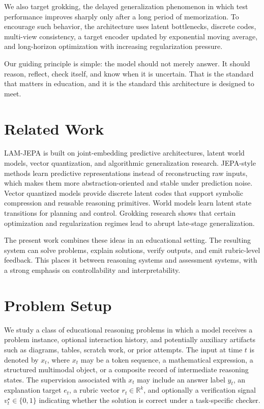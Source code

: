 \documentclass[11pt]{article}
\newcommand{\R}{\mathbb{R}}
\newcommand{\1}{\mathbbm{1}}
\begin{document}
We also target grokking, the delayed generalization phenomenon in which test performance improves sharply only after a long period of memorization. To encourage such behavior, the architecture uses latent bottlenecks, discrete codes, multi-view consistency, a target encoder updated by exponential moving average, and long-horizon optimization with increasing regularization pressure.

Our guiding principle is simple: the model should not merely answer. It should reason, reflect, check itself, and know when it is uncertain. That is the standard that matters in education, and it is the standard this architecture is designed to meet.

\section{Related Work}
LAM-JEPA is built on joint-embedding predictive architectures, latent world models, vector quantization, and algorithmic generalization research. JEPA-style methods learn predictive representations instead of reconstructing raw inputs, which makes them more abstraction-oriented and stable under prediction noise. Vector quantized models provide discrete latent codes that support symbolic compression and reusable reasoning primitives. World models learn latent state transitions for planning and control. Grokking research shows that certain optimization and regularization regimes lead to abrupt late-stage generalization.

The present work combines these ideas in an educational setting. The resulting system can solve problems, explain solutions, verify outputs, and emit rubric-level feedback. This places it between reasoning systems and assessment systems, with a strong emphasis on controllability and interpretability.

\section{Problem Setup}
We study a class of educational reasoning problems in which a model receives a problem instance, optional interaction history, and potentially auxiliary artifacts such as diagrams, tables, scratch work, or prior attempts. The input at time $t$ is denoted by $x_t$, where $x_t$ may be a token sequence, a mathematical expression, a structured multimodal object, or a composite record of intermediate reasoning states. The supervision associated with $x_t$ may include an answer label $y_t$, an explanation target $e_t$, a rubric vector $r_t \in \R^k$, and optionally a verification signal $v_t^\star \in \{0,1\}$ indicating whether the solution is correct under a task-specific checker.
\end{document}
